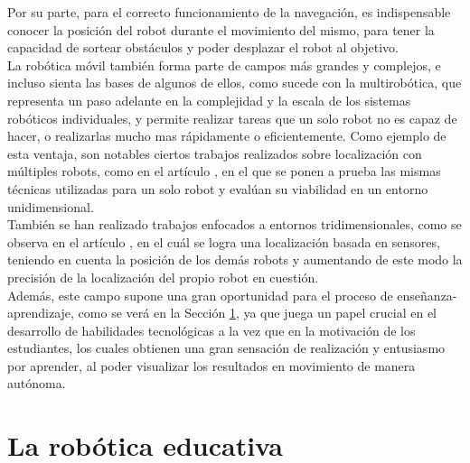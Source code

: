 Por su parte, para el correcto funcionamiento de la navegación, es indispensable
conocer la posición del robot durante el movimiento del mismo, para tener la
capacidad de sortear obstáculos y poder desplazar el robot al objetivo.
\\

La robótica móvil también forma parte de campos más grandes y complejos, e
incluso sienta las bases de algunos de ellos, como sucede con la multirobótica,
que representa un paso adelante en la complejidad y la escala de los sistemas
robóticos individuales, y permite realizar tareas que un solo robot no es capaz
de hacer, o realizarlas mucho mas rápidamente o eficientemente.
Como ejemplo de esta ventaja, son notables ciertos trabajos realizados sobre
localización con múltiples robots, como en el artículo \citet{Trawny2009}, en el
que se ponen a prueba las mismas técnicas utilizadas para un solo robot y
evalúan su viabilidad en un entorno unidimensional.
\\

También se han realizado trabajos enfocados a entornos tridimensionales, como se
observa en el artículo \citet{Fox2000}, en el cuál se logra una localización
basada en sensores, teniendo en cuenta la posición de los demás robots y
aumentando de este modo la precisión de la localización del propio robot en
cuestión.
\\

Además, este campo supone una gran oportunidad para el proceso de
enseñanza-aprendizaje, como se verá en la Sección \ref{sec:robotica_educativa},
ya que juega un papel crucial en el desarrollo de habilidades tecnológicas a la
vez que en la motivación de los estudiantes, los cuales obtienen una gran
sensación de realización y entusiasmo por aprender, al poder visualizar los
resultados en movimiento de manera autónoma.



\section{La robótica educativa}
\label{sec:robotica_educativa} %

